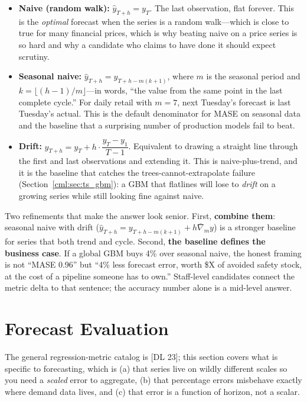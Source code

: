 \begin{itemize}
    \item \textbf{Naive (random walk):} $\hat{y}_{T+h} = y_T$. The last observation, flat forever. This is the \emph{optimal} forecast when the series is a random walk---which is close to true for many financial prices, which is why beating naive on a price series is so hard and why a candidate who claims to have done it should expect scrutiny.
    \item \textbf{Seasonal naive:} $\hat{y}_{T+h} = y_{T+h-m(k+1)}$, where $m$ is the seasonal period and $k = \lfloor (h-1)/m \rfloor$---in words, ``the value from the same point in the last complete cycle.'' For daily retail with $m=7$, next Tuesday's forecast is last Tuesday's actual. This is the default denominator for MASE on seasonal data and the baseline that a surprising number of production models fail to beat.
    \item \textbf{Drift:} $\hat{y}_{T+h} = y_T + h \cdot \dfrac{y_T - y_1}{T-1}$. Equivalent to drawing a straight line through the first and last observations and extending it. This is naive-plus-trend, and it is the baseline that catches the trees-cannot-extrapolate failure (Section~\ref{cml:sec:ts_gbm}): a GBM that flatlines will lose to \emph{drift} on a growing series while still looking fine against naive.
\end{itemize}

Two refinements that make the answer look senior. First, \textbf{combine them}: seasonal naive with drift ($\hat{y}_{T+h} = y_{T+h-m(k+1)} + h \bar{\nabla}_m y$) is a stronger baseline for series that both trend and cycle. Second, \textbf{the baseline defines the business case}. If a global GBM buys 4\% over seasonal naive, the honest framing is not ``MASE 0.96'' but ``4\% less forecast error, worth \$X of avoided safety stock, at the cost of a pipeline someone has to own.'' Staff-level candidates connect the metric delta to that sentence; the accuracy number alone is a mid-level answer.

\section{Forecast Evaluation}
\label{cml:sec:ts_evaluation}

The general regression-metric catalog is [DL 23]; this section covers what is specific to forecasting, which is (a) that series live on wildly different scales so you need a \emph{scaled} error to aggregate, (b) that percentage errors misbehave exactly where demand data lives, and (c) that error is a function of horizon, not a scalar.

